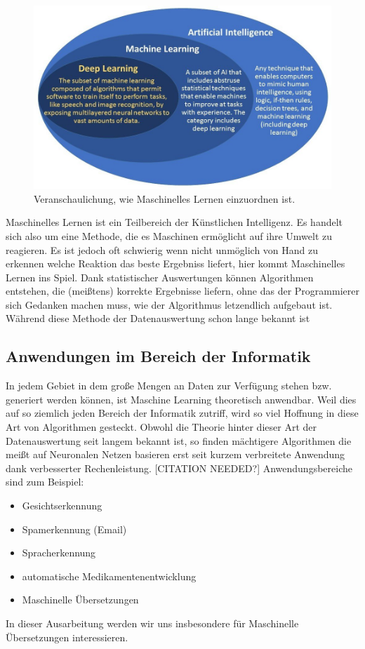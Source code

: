 \documentclass{thesisclass}
\begin{document}
\begin{figure}[h!]
  \center
  \includegraphics[width=\textwidth]{images/machineLearningInAI.jpg}
  \caption{Veranschaulichung, wie Maschinelles Lernen einzuordnen ist. \cite{machineLearning1}}
  \label{fig:Veranschaulichung, wie Maschinelles Lernen einzuordnen ist.}
\end{figure}

Maschinelles Lernen ist ein Teilbereich der Künstlichen Intelligenz. Es handelt sich also um eine Methode, die es Maschinen ermöglicht auf ihre Umwelt zu reagieren. Es ist jedoch oft schwierig wenn nicht unmöglich von Hand zu erkennen welche Reaktion das beste Ergebniss liefert, hier kommt Maschinelles Lernen ins Spiel. Dank statistischer Auswertungen können Algorithmen entstehen, die (meißtens) korrekte Ergebnisse liefern, ohne das der Programmierer sich Gedanken machen muss, wie der Algorithmus letzendlich aufgebaut ist. \newline
Während diese Methode der Datenauswertung schon lange bekannt ist  

\subsection{Anwendungen im Bereich der Informatik}
	In jedem Gebiet in dem große Mengen an Daten zur Verfügung stehen bzw. generiert werden können, ist Maschine Learning theoretisch anwendbar. Weil dies auf so ziemlich jeden Bereich der Informatik zutriff, wird so viel Hoffnung in diese Art von Algorithmen gesteckt. \newline
Obwohl die Theorie hinter dieser Art der Datenauswertung seit langem bekannt ist, so finden mächtigere Algorithmen die meißt auf Neuronalen Netzen basieren erst seit kurzem verbreitete Anwendung dank verbesserter Rechenleistung. [CITATION NEEDED?]\newline
	\newline Anwendungsbereiche sind zum Beispiel:
\begin{itemize}
	\item Gesichtserkennung
	\item Spamerkennung (Email)
	\item Spracherkennung
	\item automatische Medikamentenentwicklung
	\item Maschinelle Übersetzungen
\end{itemize}
In dieser Ausarbeitung werden wir uns insbesondere für Maschinelle Übersetzungen interessieren.
\end{document}
